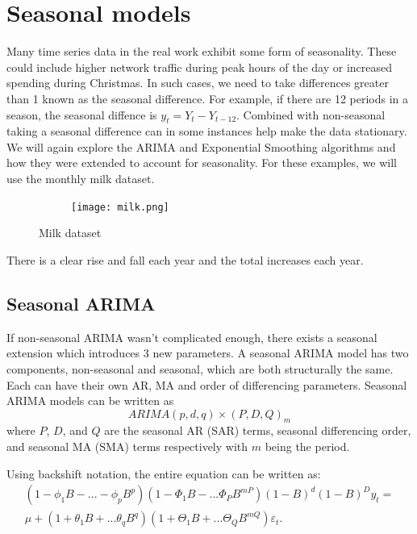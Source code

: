 \documentclass{article}
\begin{document}
  \section{Seasonal models}
  Many time series data in the real work exhibit some form of seasonality. These could include higher network traffic during peak hours of the day or increased spending during Christmas. In such cases, we need to take differences greater than 1 known as the seasonal difference. For example, if there are 12 periods in a season, the seasonal diffence is $y_t = Y_t - Y_{t-12}$. Combined with non-seasonal taking a seasonal difference can in some instances help make the data stationary. We will again explore the ARIMA and Exponential Smoothing algorithms and how they were extended to account for seasonality. For these examples, we will use the monthly milk dataset.
  \begin{figure}[H]
    \centering
    \captionsetup{justification=centering}
    \begin{subfigure}[b]{\linewidth}
      \texttt{[image: milk.png]}
    \end{subfigure}
    \caption{Milk dataset}
  \end{figure}

  There is a clear rise and fall each year and the total increases each year.

  \subsection{Seasonal ARIMA}
  If non-seasonal ARIMA wasn't complicated enough, there exists a seasonal extension which introduces 3 new parameters. A seasonal ARIMA model has two components, non-seasonal and seasonal, which are both structurally the same. Each can have their own AR, MA and order of differencing parameters. Seasonal ARIMA models can be written as 
  \begin{equation*}
    ARIMA(p,d,q)\times(P,D,Q)_m
  \end{equation*}
  where $P$, $D$, and $Q$ are the seasonal AR (SAR) terms, seasonal differencing order, and seasonal MA (SMA) terms respectively with $m$ being the period.

  Using backshift notation, the entire equation can be written as:
  \begin{equation*}
    \begin{split}
      (1 - \phi_1B - ... - \phi_pB^p)(1 - \Phi_1B - ... \Phi_PB^{mP})(1 - B)^d(1 - B)^D y_t = \\
      \mu + (1 + \theta_1B + ... \theta_qB^q)(1 + \Theta_1B + ... \Theta_QB^{mQ})\varepsilon_t.
    \end{split}
  \end{equation*}
\end{document}
